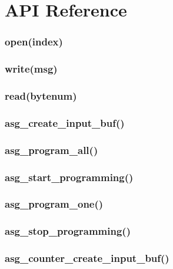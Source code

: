 \chapter{API Reference}
 
%

\subsection{open(index)}
\subsection{write(msg)}
\subsection{read(bytenum)}
\subsection{asg\_create\_input\_buf()}
\subsection{asg\_program\_all()}
\subsection{asg\_start\_programming()}
\subsection{asg\_program\_one()}
\subsection{asg\_stop\_programming()}

\subsection{asg\_counter\_create\_input\_buf()}
